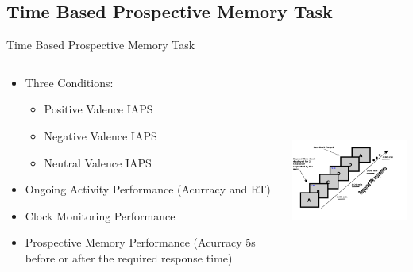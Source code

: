 \documentclass[xcolor=x11names,compress]{beamer}
\renewcommand{\(}{\begin{columns}}
\renewcommand{\)}{\end{columns}}
\newcommand{\<}[1]{\begin{column}{#1}}
\renewcommand{\>}{\end{column}}
\begin{document}

\subsection{Time Based Prospective Memory Task}
\begin{frame}{Time Based Prospective Memory Task}
  \begin{columns}[T]
    \begin{column}{.5\textwidth}
     \begin{block}{}
     \begin{itemize}
     \item Three Conditions:
     \begin{itemize}
     \item Positive Valence IAPS
     \item Negative Valence IAPS
     \item Neutral Valence IAPS
     \end{itemize}
     \item Ongoing Activity Performance (Acurracy and RT)
     \item Clock Monitoring Performance
     \item Prospective Memory Performance (Acurracy 5s before or after the required response time)
     \end{itemize}
    \end{block}
    \end{column}
    \begin{column}{.5\textwidth}
    \begin{block}{}
    \includegraphics[width=6.5cm, height=7cm]{Oneback.png}
    \end{block}
    \end{column}
  \end{columns}
\end{frame}
\end{document}
